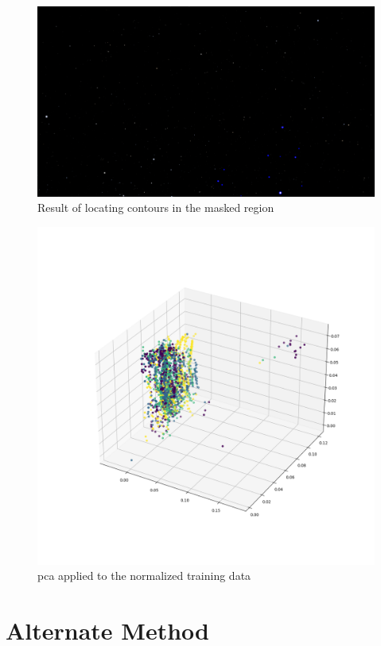 \documentclass[10pt,twocolumn,letterpaper]{article}
\begin{document}
\begin{figure}[h]
  \centering
   \includegraphics[width=0.9\linewidth]{local_contours}
   \caption{Result of locating contours in the masked region}
   \label{fig:star_local_contours}
\end{figure}

\begin{figure}[h]
  \centering
   \includegraphics[width=0.9\linewidth]{pca}
   \caption{\acrlong{pca} applied to the normalized training data}
   \label{fig:pca}
\end{figure}

\section{Alternate Method}
\label{sec:alt_method}
\end{document}

